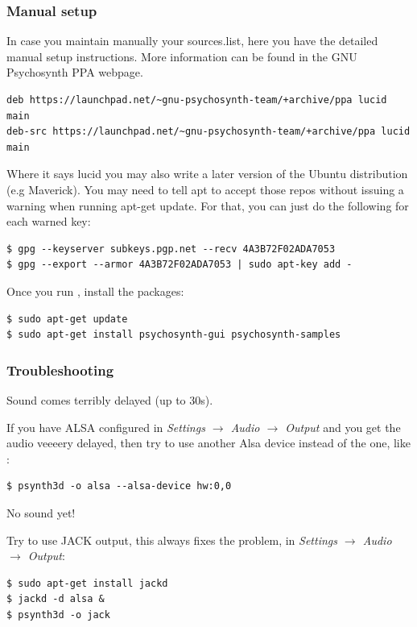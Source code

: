 \subsubsection{Manual setup}

In case you maintain manually your sources.list, here you have the
detailed manual setup instructions. More information can be found in
the GNU Psychosynth PPA webpage.
\begin{verbatim}
deb https://launchpad.net/~gnu-psychosynth-team/+archive/ppa lucid main
deb-src https://launchpad.net/~gnu-psychosynth-team/+archive/ppa lucid main
\end{verbatim}

Where it says lucid you may also write a later version of the Ubuntu
distribution (e.g Maverick). You may need to tell apt to accept those
repos without issuing a warning when running apt-get update. For that,
you can just do the following for each warned key:
\begin{verbatim}
$ gpg --keyserver subkeys.pgp.net --recv 4A3B72F02ADA7053
$ gpg --export --armor 4A3B72F02ADA7053 | sudo apt-key add - 
\end{verbatim}

Once you run , install the packages:
\begin{verbatim}
$ sudo apt-get update
$ sudo apt-get install psychosynth-gui psychosynth-samples 
\end{verbatim}

\subsubsection{Troubleshooting}

\begin{troubleshoot}
Sound comes terribly delayed (up to 30s).
\end{troubleshoot}

If you have ALSA configured in \emph{Settings $\rightarrow$ Audio
  $\rightarrow$ Output} and you get the audio veeeery delayed, then
try to use another Alsa device instead of the  one, like
:
\begin{verbatim}
$ psynth3d -o alsa --alsa-device hw:0,0
\end{verbatim}

\begin{troubleshoot}
No sound yet!
\end{troubleshoot}

Try to use JACK output, this always fixes the problem, in
\emph{Settings $\rightarrow$ Audio
  $\rightarrow$ Output}:
\begin{verbatim}
$ sudo apt-get install jackd
$ jackd -d alsa &
$ psynth3d -o jack
\end{verbatim}

